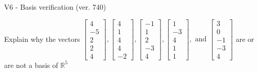 \begin{exercise}
  \begin{exerciseTitle}V6 - Basis verification (ver. 740)\end{exerciseTitle}
  \begin{exerciseStatement}
    Explain why the vectors \(\left[\begin{array}{r}
4 \\
-5 \\
2 \\
2 \\
4
\end{array}\right] , \left[\begin{array}{r}
4 \\
1 \\
4 \\
4 \\
-2
\end{array}\right] , \left[\begin{array}{r}
-1 \\
1 \\
2 \\
-3 \\
4
\end{array}\right] , \left[\begin{array}{r}
1 \\
-3 \\
4 \\
1 \\
1
\end{array}\right] , \text{ and } \left[\begin{array}{r}
3 \\
0 \\
-1 \\
-3 \\
4
\end{array}\right]\) are or are not a basis of \(\mathbb{R}^5\)	



\end{exerciseStatement}
\end{exercise}
